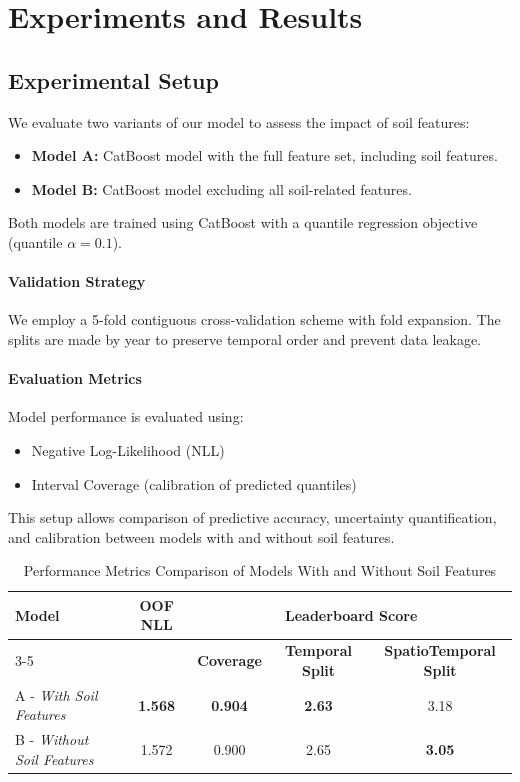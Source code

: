 \documentclass[a4paper,12pt]{article}
\begin{document}
\section{Experiments and Results}
\subsection{Experimental Setup}
We evaluate two variants of our model to assess the impact of soil features:
\begin{itemize}
    \item \textbf{Model A:} CatBoost model with the full feature set, including soil features.
    \item \textbf{Model B:} CatBoost model excluding all soil-related features.
\end{itemize}

Both models are trained using CatBoost with a quantile regression objective (quantile $\alpha=0.1$).

\paragraph{Validation Strategy}  
We employ a 5-fold contiguous cross-validation scheme with fold expansion. The splits are made by year to preserve temporal order and prevent data leakage.

\paragraph{Evaluation Metrics}  
Model performance is evaluated using:
\begin{itemize}
    \item Negative Log-Likelihood (NLL)
    \item Interval Coverage (calibration of predicted quantiles)
\end{itemize}

This setup allows comparison of predictive accuracy, uncertainty quantification, and calibration between models with and without soil features.

\begin{table}[htbp]
\centering
\label{tab:metrics_comparison}
\begin{tabular}{lcccc}
\hline
\textbf{Model} & \textbf{OOF NLL} & \multicolumn{3}{c}{\textbf{Leaderboard Score}} \\
\cline{3-5}
 & & \textbf{Coverage} & \textbf{Temporal Split} & \textbf{SpatioTemporal Split} \\
\hline
A - \textit{With Soil Features} & \textbf{1.568} & \textbf{0.904} & \textbf{2.63} & 3.18 \\
B - \textit{Without Soil Features} & 1.572 & 0.900 & 2.65 & \textbf{3.05} \\
\end{tabular}
\caption{Performance Metrics Comparison of Models With and Without Soil Features}
\end{table}
\end{document}
